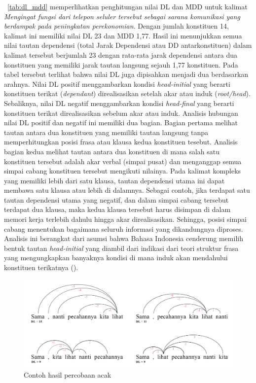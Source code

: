 \tab~\ref{tab:dl_mdd} memperlihatkan penghitungan nilai DL dan MDD untuk kalimat \textit{Mengingat fungsi dari telepon seluler tersebut sebagai sarana komunikasi yang berdampak pada peningkatan perekonomian}. Dengan jumlah konstituen 14, kalimat ini memiliki nilai DL 23 dan MDD 1,77. Hasil ini menunjukkan semua nilai tautan dependensi (total Jarak Dependensi atau DD antarkonstituen) dalam kalimat tersebut berjumlah 23 dengan rata-rata jarak dependensi antara dua konstituen yang memiliki jarak tautan langsung sejauh 1,77 konstituen. Pada tabel tersebut terlihat bahwa nilai DL juga dipisahkan menjadi dua berdasarkan arahnya. Nilai DL positif menggambarkan kondisi \textit{head-initial} yang berarti konstituen terikat (\textit{dependant}) direalisasikan setelah akar atau induk (\textit{root/head}). Sebaliknya, nilai DL negatif menggambarkan kondisi \textit{head-final} yang berarti konstituen terikat direalisasikan sebelum akar atau induk. Analisis hubungan nilai DL positif dan negatif ini memiliki dua bagian. Bagian pertama melihat tautan antara dua konstituen yang memiliki tautan langsung tanpa memperhitungkan posisi frasa atau klausa kedua konstituen tesebut. Analisis bagian kedua melihat tautan antara dua konstituen di mana salah satu konstituen tersebut adalah akar verbal (simpai pusat) dan menganggap semua simpai cabang konstituen tersebut mengikuti nilainya. Pada kalimat kompleks yang memiliki lebih dari satu klausa, tautan dependensi utama ini dapat membawa satu klausa atau lebih di dalamnya. Sebagai contoh, jika terdapat satu tautan dependensi utama yang negatif, dan dalam simpai cabang tersebut terdapat dua klausa, maka kedua klausa tersebut harus disimpan di dalam memori kerja terlebih dahulu hingga akar direalisasikan. Sehingga, posisi simpai cabang menentukan bagaimana seluruh informasi yang dikandungnya diproses. Analisis ini berangkat dari asumsi bahwa Bahasa Indonesia cenderung memilih bentuk tautan \textit{head-initial} yang diambil dari indikasi dari teori struktur frasa yang mengungkapkan banyaknya kondisi di mana induk akan mendahului konstituen terikatnya (\citealp{kridalaksana2002struktur, sneddon2010indonesian}).

\begin{figure}
	\centering \includegraphics[width=0.8
	\textwidth] {pics/percobaan_acak.jpg} 
	\caption{Contoh hasil percobaan acak} 
\label{fig:percobaan_acak} 
\end{figure}

